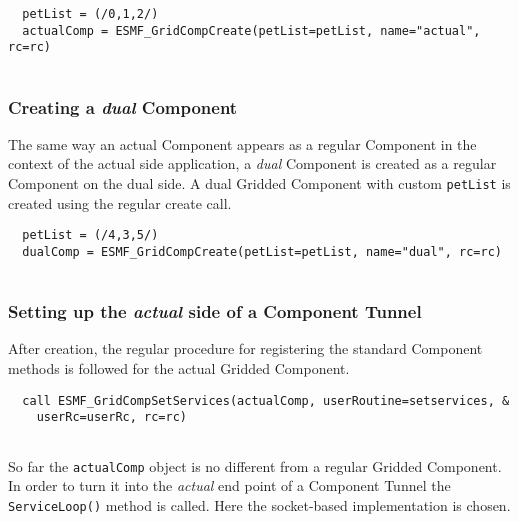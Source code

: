  \begin{verbatim}
  petList = (/0,1,2/)
  actualComp = ESMF_GridCompCreate(petList=petList, name="actual", rc=rc)
 
\end{verbatim}
 

  \subsubsection{Creating a {\em dual} Component}
   
   \label{sec:CompTunnelDualCreate}
  
   The same way an actual Component appears as a regular Component in
   the context of the actual side application, a {\em dual} Component
   is created as a regular Component on the dual side.
   A dual Gridded Component with custom {\tt petList} is created using the
   regular create call. 

 \begin{verbatim}
  petList = (/4,3,5/)
  dualComp = ESMF_GridCompCreate(petList=petList, name="dual", rc=rc)
 
\end{verbatim}
 

  \subsubsection{Setting up the {\em actual} side of a Component Tunnel}
   
   \label{sec:CompTunnelActualSide}
  
   After creation, the regular procedure for registering the standard Component
   methods is followed for the actual Gridded Component. 

 \begin{verbatim}
  call ESMF_GridCompSetServices(actualComp, userRoutine=setservices, &
    userRc=userRc, rc=rc)
 
\end{verbatim}
 

   So far the {\tt actualComp} object is no different from a regular Gridded
   Component. In order to turn it into the {\em actual} end point of a Component
   Tunnel the {\tt ServiceLoop()} method is called. Here the socket-based
   implementation is chosen. 

